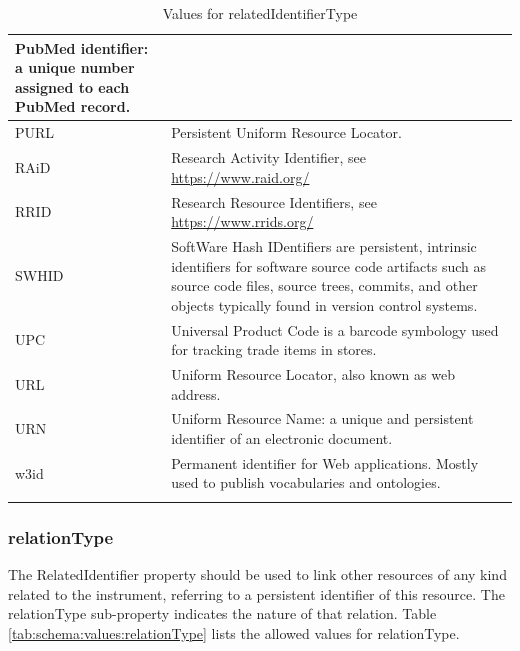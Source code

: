 \documentclass[titlepage=true,twoside=false,DIV=13]{scrartcl}
\begin{document}
\begin{longtable}{|l|p{\valdefcolw}|}
  PubMed identifier: a unique number assigned to each PubMed record.
  \\ \hline
  PURL    &
  Persistent Uniform Resource Locator.
  \\ \hline
  RAiD    &
  Research Activity Identifier, see \url{https://www.raid.org/}
  \\ \hline
  RRID    &
  Research Resource Identifiers, see \url{https://www.rrids.org/}
  \\ \hline
  SWHID   &
  SoftWare Hash IDentifiers are persistent, intrinsic identifiers for
  software source code artifacts such as source code files, source
  trees, commits, and other objects typically found in version control
  systems.
  \\ \hline
  UPC     &
  Universal Product Code is a barcode symbology used for tracking
  trade items in stores.
  \\ \hline
  URL     &
  Uniform Resource Locator, also known as web address.
  \\ \hline
  URN     &
  Uniform Resource Name: a unique and persistent identifier of an
  electronic document.
  \\ \hline
  w3id    &
  Permanent identifier for Web applications.  Mostly used to publish
  vocabularies and ontologies.
  \\ \hline
  \caption{Values for relatedIdentifierType}
  \label{tab:schema:values:relatedIdentifierType}
\end{longtable}

\subsubsection{relationType}

The RelatedIdentifier property should be used to link other resources
of any kind related to the instrument, referring to a persistent
identifier of this resource.  The relationType sub-property indicates
the nature of that relation.  Table
\ref{tab:schema:values:relationType} lists the allowed values for
relationType.
\end{document}
